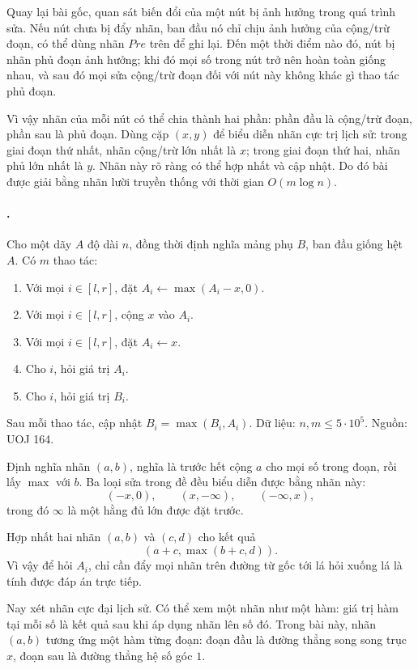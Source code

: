 \documentclass[11pt]{article}
\begin{document}
Quay lại bài gốc, quan sát biến đổi của một nút bị ảnh hưởng trong quá trình
sửa. Nếu nút chưa bị đẩy nhãn, ban đầu nó chỉ chịu ảnh hưởng của cộng/trừ
đoạn, có thể dùng nhãn \(\mathit{Pre}\) trên để ghi lại. Đến một thời điểm
nào đó, nút bị nhãn phủ đoạn ảnh hưởng; khi đó mọi số trong nút trở nên hoàn
toàn giống nhau, và sau đó mọi sửa cộng/trừ đoạn đối với nút này không khác
gì thao tác phủ đoạn.

Vì vậy nhãn của mỗi nút có thể chia thành hai phần: phần đầu là cộng/trừ
đoạn, phần sau là phủ đoạn. Dùng cặp \((x,y)\) để biểu diễn nhãn cực trị lịch
sử: trong giai đoạn thứ nhất, nhãn cộng/trừ lớn nhất là \(x\); trong giai
đoạn thứ hai, nhãn phủ lớn nhất là \(y\). Nhãn này rõ ràng có thể hợp nhất và
cập nhật. Do đó bài được giải bằng nhãn lười truyền thống với thời gian
\(O(m\log n)\).

\paragraph{.}
Cho một dãy \(A\) độ dài \(n\), đồng thời định nghĩa mảng phụ \(B\), ban đầu
giống hệt \(A\). Có \(m\) thao tác:
\begin{enumerate}
  \item Với mọi \(i\in[l,r]\), đặt \(A_i\leftarrow \max(A_i-x,0)\).
  \item Với mọi \(i\in[l,r]\), cộng \(x\) vào \(A_i\).
  \item Với mọi \(i\in[l,r]\), đặt \(A_i\leftarrow x\).
  \item Cho \(i\), hỏi giá trị \(A_i\).
  \item Cho \(i\), hỏi giá trị \(B_i\).
\end{enumerate}
Sau mỗi thao tác, cập nhật \(B_i=\max(B_i,A_i)\). Dữ liệu:
\(n,m\le 5\cdot 10^5\). Nguồn: UOJ 164.

Định nghĩa nhãn \((a,b)\), nghĩa là trước hết cộng \(a\) cho mọi số trong
đoạn, rồi lấy \(\max\) với \(b\). Ba loại sửa trong đề đều biểu diễn được
bằng nhãn này:
\[
  (-x,0),\qquad (x,-\infty),\qquad (-\infty,x),
\]
trong đó \(\infty\) là một hằng đủ lớn được đặt trước.

Hợp nhất hai nhãn \((a,b)\) và \((c,d)\) cho kết quả
\[
  (a+c,\max(b+c,d)).
\]
Vì vậy để hỏi \(A_i\), chỉ cần đẩy mọi nhãn trên đường từ gốc tới lá hỏi xuống
lá là tính được đáp án trực tiếp.

Nay xét nhãn cực đại lịch sử. Có thể xem một nhãn như một hàm: giá trị hàm
tại mỗi số là kết quả sau khi áp dụng nhãn lên số đó. Trong bài này, nhãn
\((a,b)\) tương ứng một hàm từng đoạn: đoạn đầu là đường thẳng song song trục
\(x\), đoạn sau là đường thẳng hệ số góc \(1\).
\end{document}
